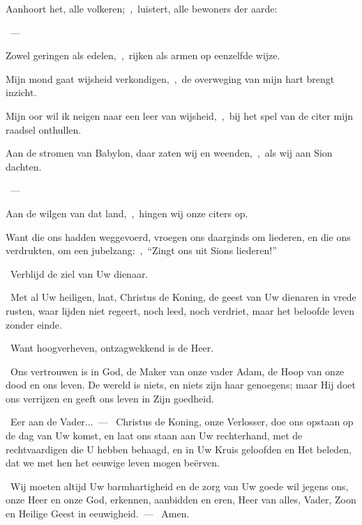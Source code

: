 \documentclass[12pt,twoside,a5paper]{article}
\begin{document}

\begin{halfparskip}
  Aanhoort het, alle volkeren;~\sep\ luistert, alle bewoners der aarde:

  ~--- 

  Zowel geringen als edelen,~\sep\ rijken als armen op eenzelfde wijze.

  Mijn mond gaat wijsheid verkondigen,~\sep\ de overweging van mijn hart brengt inzicht.

  Mijn oor wil ik neigen naar een leer van wijsheid,~\sep\ bij het spel van de citer mijn raadsel onthullen.
\end{halfparskip}


\begin{halfparskip}
  Aan de stromen van Babylon, daar zaten wij en weenden,~\sep\ als wij aan Sion dachten.

  ~--- 

  Aan de wilgen van dat land,~\sep\ hingen wij onze citers op.

  Want die ons hadden weggevoerd, vroegen ons daarginds om liederen, en die ons verdrukten, om een jubelzang:~\sep\ ``Zingt ons uit Sions liederen!''
\end{halfparskip}

 



\begin{halfparskip}
  \dd~Verblijd de ziel van Uw dienaar.

  \rr~Met al Uw heiligen, laat, Christus de Koning, de geest van Uw dienaren in vrede rusten, waar lijden niet regeert, noch leed, noch verdriet, maar het beloofde leven zonder einde.

  \dd~Want hoogverheven, ontzagwekkend is de Heer.

  \rr~Ons vertrouwen is in God, de Maker van onze vader Adam, de Hoop van onze dood en ons leven. De wereld is niets, en niets zijn haar genoegens; maar Hij doet ons verrijzen en geeft ons leven in Zijn goedheid.

  \cc~Eer aan de Vader...~--- \rr~Christus de Koning, onze Verlosser, doe ons opstaan op de dag van Uw komst, en laat ons staan aan Uw rechterhand, met de rechtvaardigen die U hebben behaagd, en in Uw Kruis geloofden en Het beleden, dat we met hen het eeuwige leven mogen beërven.

  \liturgicalhint{*} \cc~Wij moeten altijd Uw barmhartigheid en de zorg van Uw goede wil jegens ons, onze Heer en onze God, erkennen, aanbidden en eren, Heer van alles, Vader, Zoon en Heilige Geest in eeuwigheid.~--- \rr~Amen.
\end{halfparskip}
\end{document}
